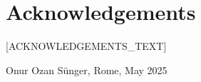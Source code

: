 \chapter*{Acknowledgements}

[ACKNOWLEDGEMENTS\_TEXT]

\vspace{2em}
\begin{flushright}
  Onur Ozan Sünger, Rome, May 2025
\end{flushright}
